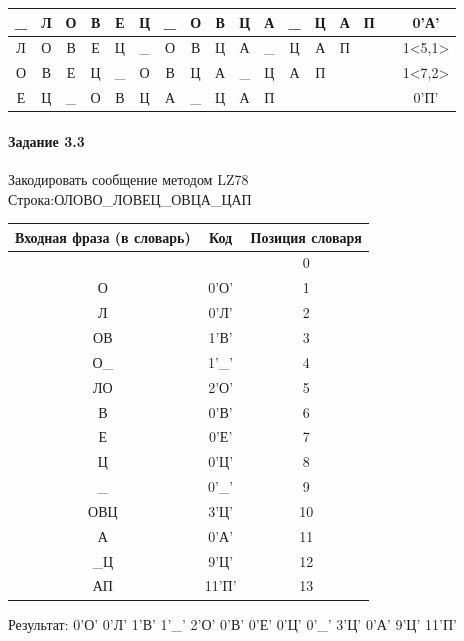 \documentclass[a4paper, 12pt]{article}
\begin{document}
\begin{table}[h!]
\begin{tabular}{|c|c|c|c|c|c|c|c|c|c|c|c|c|c|c|c|c|}
\_ & Л & О & В & Е & Ц & \_ & О & В & Ц & А & \_ & Ц & А & П &   & 0'А'\\ \hline
Л & О & В & Е & Ц & \cellcolor[HTML]{FFFF00} \_ & О & В & Ц & А & \cellcolor[HTML]{FFFF00} \_ & Ц & А & П &   &   & 1<5,1>\\ \hline
О & В & Е & Ц & \_ & О & В & \cellcolor[HTML]{FFFF00} Ц & \cellcolor[HTML]{FFFF00} А & \_ & \cellcolor[HTML]{FFFF00} Ц & \cellcolor[HTML]{FFFF00} А & П &   &   &   & 1<7,2>\\ \hline
Е & Ц & \_ & О & В & Ц & А & \_ & Ц & А & П &   &   &   &   &   & 0'П'\\ \hline
\end{tabular}
\end{table}

\paragraph{Задание 3.3}

Закодировать сообщение методом LZ78\\
Строка:ОЛОВО\_ЛОВЕЦ\_ОВЦА\_ЦАП\\
\begin{table}[h!]
\centering
\begin{tabular}{|c|c|c|} 
\hline
 Входная фраза (в словарь) & Код & Позиция словаря \\ \hline

 &  & 0 \\ \hline
О & 0'О' & 1 \\ \hline
Л & 0'Л' & 2 \\ \hline
ОВ & 1'В' & 3 \\ \hline
О\_ & 1'\_' & 4 \\ \hline
ЛО & 2'О' & 5 \\ \hline
В & 0'В' & 6 \\ \hline
Е & 0'Е' & 7 \\ \hline
Ц & 0'Ц' & 8 \\ \hline
\_ & 0'\_' & 9 \\ \hline
ОВЦ & 3'Ц' & 10 \\ \hline
А & 0'А' & 11 \\ \hline
\_Ц & 9'Ц' & 12 \\ \hline
АП & 11'П' & 13 \\ \hline
\end{tabular}
\end{table}

Результат: 0'О' 0'Л' 1'В' 1'\_' 2'О' 0'В' 0'Е' 0'Ц' 0'\_' 3'Ц' 0'А' 9'Ц' 11'П'\\
\pagebreak
\end{document}
